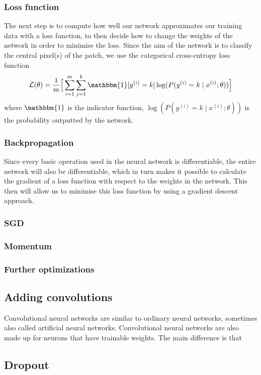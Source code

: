 \documentclass[12pt,a4paper,twoside,openright]{report}
\begin{document}
\subsubsection{Loss function}
The next step is to compute how well our network approximates our training data with a loss function, to then decide how to change the weights of the network in order to minimise the loss. Since the aim of the network is to classify the central pixel(s) of the patch, we use the categorical cross-entropy loss function
\begin{equation}
	\mathcal{L}(\theta) = 
	\frac{1}{m}\Big[\sum_{i=1}^m \sum_{j=1}^k\mathbbm{1}[y^{(i)} = k]\log(P(y^{(i)}=k \mid x^{(i)};\theta))\Big]
\end{equation}
where $\mathbbm{1}$ is the indicator function, $\log(P(y^{(i)}=k \mid x^{(i)};\theta))$ is the probability outputted by the network.
\subsubsection{Backpropagation}
Since every basic operation used in the neural network is differentiable, the entire network will also be differentiable, which in turn makes it possible to calculate the gradient of a loss function with respect to the weights in the network. This then will allow us to minimise this loss function by using a gradient descent approach.

\subsubsection{SGD}

\subsubsection{Momentum}
\subsubsection{Further optimizations}
\subsection{Adding convolutions}
Convolutional neural networks are similar to ordinary neural networks, sometimes also called artificial neural networks. Convolutional neural networks are also made up for neurons that have trainable weights. The main difference is that
\subsection{Dropout}
\end{document}
